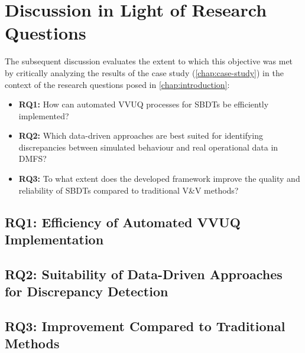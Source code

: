 \section{Discussion in Light of Research Questions}
\label{sec:discussion_rqs}
The subsequent discussion evaluates the extent to which this objective was met by critically analyzing the results of the case study (\autoref{chap:case-study}) in the context of the research questions posed in \autoref{chap:introduction}:
\begin{itemize}
    \item \textbf{RQ1:} How can automated VVUQ processes for SBDTs be efficiently implemented?
    \item \textbf{RQ2:} Which data-driven approaches are best suited for identifying discrepancies between simulated behaviour and real operational data in DMFS?
    \item \textbf{RQ3:} To what extent does the developed framework improve the quality and reliability of SBDTs compared to traditional V&V methods?
\end{itemize}

\subsection{RQ1: Efficiency of Automated VVUQ Implementation}
\label{sec:discussion_rq1}

\subsection{RQ2: Suitability of Data-Driven Approaches for Discrepancy Detection}
\label{sec:discussion_rq2}

\subsection{RQ3: Improvement Compared to Traditional Methods}
\label{sec:discussion_rq3}

